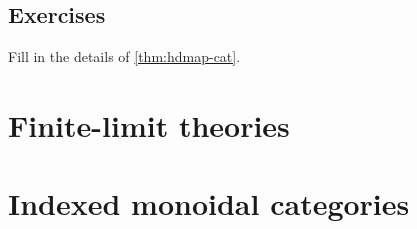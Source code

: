 \begin{wip}

\subsection*{Exercises}

\begin{ex}\label{ex:hdmap-cat}
  Fill in the details of \cref{thm:hdmap-cat}.
\end{ex}

\end{wip}


\section{Finite-limit theories}
\label{sec:lex-theories}




\section{Indexed monoidal categories}
\label{sec:indexed-moncat}


\ChapterExercises

